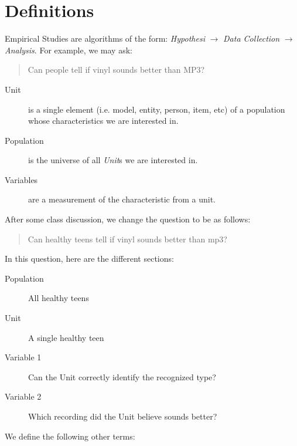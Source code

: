             \section{Definitions} %
            \label{sec:definitions}
                Empirical Studies are algorithms of the form: \emph{Hypothesi} $\to$ \emph{Data Collection} $\to$ \emph{Analysis}.
                For example, we may ask:
                \begin{quote}
                    Can people tell if vinyl sounds better than MP3?
                \end{quote}
                \begin{description}
                    \item[Unit] is a single element (i.e. model, entity, person, item, etc) of a population whose characteristics we are interested in.
                    \item[Population] is the universe of all \emph{Unit}s we are interested in.
                    \item[Variables] are a measurement of the characteristic from a unit.
                \end{description}
                After some class discussion, we change the question to be as follows:
                \begin{quote}
                    Can healthy teens tell if vinyl sounds better than mp3?
                \end{quote}
                In this question, here are the different sections:
                \begin{description}
                    \item[Population] All healthy teens
                    \item[Unit] A single healthy teen
                    \item[Variable 1] Can the Unit correctly identify the recognized type?
                    \item[Variable 2] Which recording did the Unit believe sounds better?
                \end{description}
                We define the following other terms:
